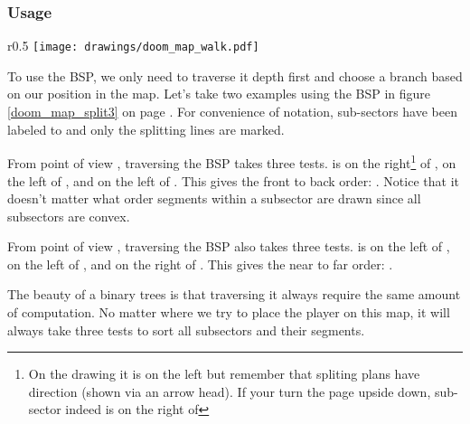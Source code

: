 \par

\vspace{-10pt}
\subsubsection{Usage}

\begin{wrapfigure}[10]{r}{0.5\textwidth}
\centering
\texttt{[image: drawings/doom\_map\_walk.pdf]}
\end{wrapfigure}
To use the BSP, we only need to traverse it depth first and choose a branch based on our position in the map. Let's take two examples using the BSP in figure \ref{doom_map_split3} on page \pageref{doom_map_split3}. For convenience of notation, sub-sectors have been labeled  to  and only the splitting lines are marked.\\
\par
From point of view , traversing the BSP takes three tests.  is on the right\footnote{On the drawing it is on the left but remember that spliting plans have direction (shown via an arrow head). If your turn the page upside down, sub-sector  indeed is on the right of } of , on the left of , and on the left of . This gives the front to back order: . Notice that it doesn't matter what order segments within a subsector are drawn since all subsectors are convex.\\
\par
From point of view , traversing the BSP also takes three tests.  is on the left of , on the left of , and on the right of . This gives the near to far order: .\\
\par
The beauty of a binary trees is that traversing it always require the same amount of computation. No matter where we try to place the player on this map, it will always take three tests to sort all subsectors and their segments.
\pagebreak





